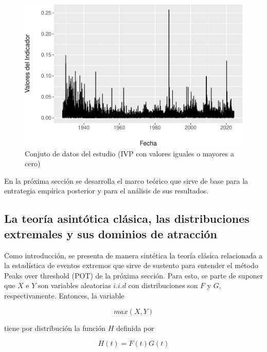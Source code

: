 \documentclass[
  12pt]{article}
\begin{document}
\begin{figure}
\centering
\includegraphics{Entrega_files/figure-latex/fig2-1.pdf}
\caption{Conjuto de datos del estudio (IVP con valores iguales o mayores
a cero)}
\end{figure}

En la próxima sección se desarrolla el marco teórico que sirve de base
para la entrategia empírica posterior y para el análisis de sus
resultados.

\newpage

\subsection{La teoría asintótica clásica, las distribuciones extremales
y sus dominios de
atracción}\label{la-teoruxeda-asintuxf3tica-cluxe1sica-las-distribuciones-extremales-y-sus-dominios-de-atracciuxf3n}

Como introducción, se presenta de manera sintética la teoría clásica
relacionada a la estadística de eventos extremos que sirve de sustento
para entender el método Peaks over threshold (POT) de la próxima
sección. Para esto, se parte de suponer que \(X\) e \(Y\) son variables
aleatorias \(i.i.d\) con distribuciones son \(F\) y \(G\),
respectivamente. Entonces, la variable

\begin{equation}
max(X,Y)
\end{equation}

tiene por distribución la función \(H\) definida por

\begin{equation}
H(t)= F(t) G(t)
\end{equation}
\end{document}
